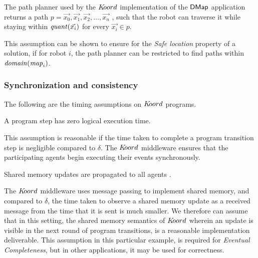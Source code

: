 \begin{assumption}
    The path planner used by the $K\kern-2pt oord$ implementation of the ${\sf DMap}$ application returns a path $p = \Vec{x_0},\Vec{x_1}, \Vec{x_2},\ldots, \Vec{x_n}$ , such that the robot can traverse it while staying within $\mathit{quant}(\Vec{x_i})$ for every $\Vec{x_i}\in p$.
\end{assumption}

This assumption can be shown to ensure for the \emph{Safe location} property of a solution, if for robot $i$, the path planner can be restricted to find paths within $\mathit{domain}(\mathit{map}_i)$.




\subsubsection{Synchronization and consistency}
The following are the timing assumptions on $K\kern-2pt oord$ programs.
\begin{assumption} A program step has zero logical execution time.
\end{assumption}
This assumption is reasonable if the time taken to complete a program transition step is negligible compared to $\delta$.  The $K\kern-2pt oord$ middleware ensures that the participating agents begin executing their events synchronously.

\begin{assumption} Shared memory updates are propagated to all agents .
\end{assumption}
The $K\kern-2pt oord$ middleware uses message passing to implement shared memory, and compared to $\delta$, the time taken to observe a shared memory update as a received message from the time that it is sent is much smaller. We therefore can assume that in this setting, the shared memory semantics of $K\kern-2pt oord$ wherein an update is visible in the next round of program transitions, is a reasonable implementation deliverable. This assumption in this particular example, is required for \emph{Eventual Completeness}, but in other applications, it may be used for correctness.


